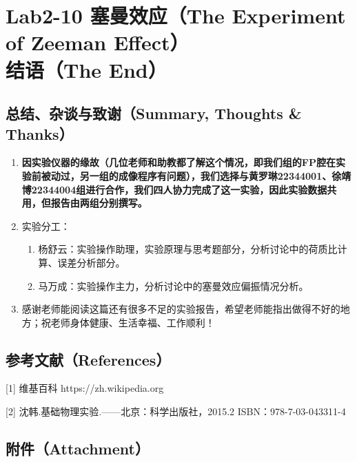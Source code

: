 \documentclass[dvipsnames, svgnames,a4paper,11pt]{article}
\begin{document}
	
	
	
	
	
	
	\clearpage
	
	\section{Lab2-10 塞曼效应（The Experiment of Zeeman Effect）\\ \quad\heiti 结语（The End）}
	
	\subsection{总结、杂谈与致谢（Summary, Thoughts \& Thanks）}
	\begin{enumerate}
		\item \textbf{因实验仪器的缘故（几位老师和助教都了解这个情况，即我们组的FP腔在实验前被动过，另一组的成像程序有问题），我们选择与黄罗琳22344001、徐靖博22344004组进行合作，我们四人协力完成了这一实验，因此实验数据共用，但报告由两组分别撰写。}
		\item 实验分工：
		\begin{enumerate}
			\item 杨舒云：实验操作助理，实验原理与思考题部分，分析讨论中的荷质比计算、误差分析部分。
			\item 马万成：实验操作主力，分析讨论中的塞曼效应偏振情况分析。
		\end{enumerate}
		\item 感谢老师能阅读这篇还有很多不足的实验报告，希望老师能指出做得不好的地方；祝老师身体健康、生活幸福、工作顺利！
	\end{enumerate}
	
	\subsection{参考文献（References）}
	[1] 维基百科 https://zh.wikipedia.org
	
	[2] 沈韩.基础物理实验.——北京：科学出版社，2015.2 ISBN：978-7-03-043311-4
	
	
	\subsection{附件（Attachment）}
	
\end{document}

